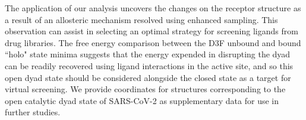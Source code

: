 The application of our analysis uncovers the changes on the receptor structure as a result of an allosteric mechanism resolved using enhanced sampling. This observation can assist in selecting an optimal strategy for screening ligands from drug libraries. The free energy comparison between the D3F unbound and bound ``holo" state minima suggests that the energy expended in disrupting the dyad can be readily recovered using ligand interactions in the active site, and so this open dyad state should be considered alongside the closed state as a target for virtual screening. We provide coordinates for structures corresponding to the open catalytic dyad state of SARS-CoV-2 \mpro as supplementary data for use in further studies. 
%
%
%
%
